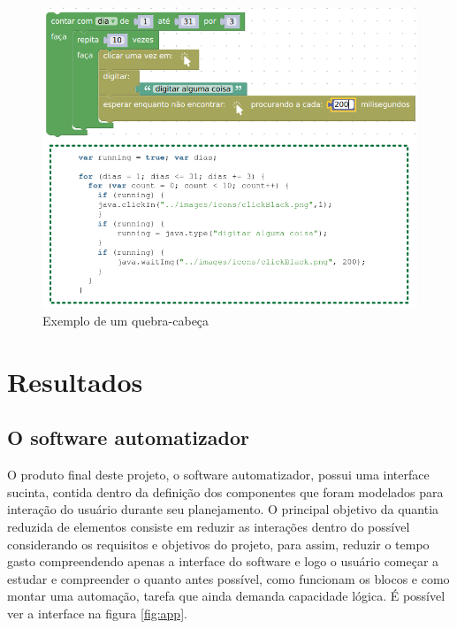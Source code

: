 \documentclass[tg]{mdtufsm}
\begin{document}
                    \begin{figure}[!htb]
                        {\centering
                        \includegraphics[width=1.0\textwidth]{imagens/blocosecodigo.png}
                        \caption{Exemplo de um quebra-cabeça}
                        \label{fig:blocosecodigo}}
                    \end{figure}

        \chapter {Resultados}

            \section {O software automatizador}

                O produto final deste projeto, o software automatizador, possui uma interface sucinta, contida dentro da definição dos componentes que foram modelados para interação do usuário durante seu planejamento. O principal objetivo da quantia reduzida de elementos consiste em reduzir as interações dentro do possível considerando os requisitos e objetivos do projeto, para assim, reduzir o tempo gasto compreendendo apenas a interface do software e logo o usuário começar a estudar e compreender o quanto antes possível, como funcionam os blocos e como montar uma automação, tarefa que ainda demanda capacidade lógica. É possível ver a interface na figura \ref{fig:app}.
\end{document}

